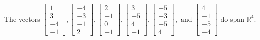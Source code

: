 \begin{exercise}
\begin{exerciseStatement}
  \end{exerciseStatement}
  \begin{exerciseAnswer}
   The vectors \(\left[\begin{array}{r}
1 \\
3 \\
-4 \\
-1
\end{array}\right] , \left[\begin{array}{r}
-4 \\
-3 \\
-1 \\
2
\end{array}\right] , \left[\begin{array}{r}
2 \\
-1 \\
0 \\
-1
\end{array}\right] , \left[\begin{array}{r}
3 \\
-5 \\
4 \\
-1
\end{array}\right] , \left[\begin{array}{r}
-5 \\
-3 \\
-5 \\
4
\end{array}\right] , \text{ and } \left[\begin{array}{r}
4 \\
-1 \\
-5 \\
-4
\end{array}\right]\) 
  	 do  
	span \(\mathbb{R}^4\).
  


  \end{exerciseAnswer}
\end{exercise}